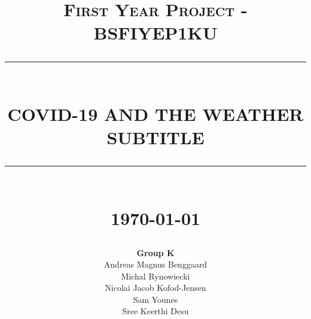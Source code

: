 \documentclass[11pt]{article}
\newcommand{\HRule}[1]{\rule{\linewidth}{#1}}
\begin{document}
% 
\title{ \normalsize \textsc{First Year Project - BSFIYEP1KU}
		\\ [2.0cm]
		\HRule{0.5pt} \\
		\LARGE \textbf{\uppercase{COVID-19 and the Weather}\\
		\normalsize{\textsc{SUBTITLE}}}
		\HRule{2pt} \\ [0.5cm]
		\normalsize \today \vspace*{5\baselineskip}}

\date{}

\author{
		\textbf{Group K} \\ 
		Andreas Magnus Benggaard\\ 
		Michal Rynowiecki \\ 
		Nicolai Jacob Kofod-Jensen \\ 
		Sam Younes \\ 
		Sree Keerthi Desu }

\maketitle
\newpage

\tableofcontents
\newpage

\sectionfont{\scshape}











\newpage
{}

\end{document}
